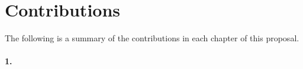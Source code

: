 
\section*{Contributions}
The following is a summary of the contributions in each chapter of this proposal. 

\paragraph*{1.}

